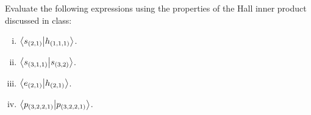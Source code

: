 \documentclass[12pt]{memoir}
\begin{document}
\begin{Ej}[Exercise 1]
    Evaluate the following expressions using the properties of the Hall inner product discussed in class:\vspace{-0.4em}
    \begin{enumerate}[i)]
        \itemsep=-0.4em
        \item $\braket{s_{(2,1)}}{h_{(1,1,1)}}$.
        \item $\braket{s_{(3,1,1)}}{s_{(3,2)}}$.
        \item $\braket{e_{(2,1)}}{h_{(2,1)}}$.
        \item $\braket{p_{(3,2,2,1)}}{p_{(3,2,2,1)}}$.
    \end{enumerate}
\end{Ej}

\begin{ptcbr}
    
\end{ptcbr}
\end{document}
